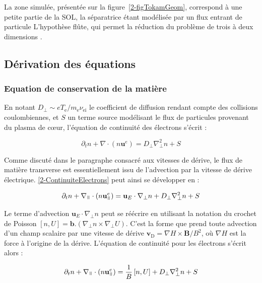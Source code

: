 \begin{refsection}
La zone simulée, présentée sur la figure~\ref{2-figTokamGeom}, correspond à une
petite partie de la SOL, la séparatrice étant modélisée par un flux entrant de
particule L'hypothèse flûte, qui permet la réduction du problème de trois à deux
dimensions .

\subsection{Dérivation des équations}
\subsubsection{Equation de conservation de la matière}
En notant $D_\perp\sim eT_\text{e}/m_\text{e}\nu_\text{ei}$ le coefficient de
diffusion rendant compte des collisions coulombiennes, et $S$ un terme source modélisant le flux de particules
provenant du plasma de c\oe{}ur, l'équation de continuité des électrons s'écrit :

\begin{equation}
\label{2-ContinuiteElectrons}
\partial_t n + \nabla\cdot(n\mathbf{u}^e) = D_\perp\nabla^2_\perp n + S
\end{equation}

Comme discuté dans le paragraphe consacré aux vitesses de dérive, le flux de
matière transverse est essentiellement issu de l'advection par la vitesse de
dérive électrique. \eqref{2-ContinuiteElectrons} peut ainsi se
développer en :

\begin{equation}
\label{2-ContinuiteElectrons2}
\partial_t n + \nabla_\para\cdot(n\mathbf{u}^e_{\para}) =
\mathbf{u}_E\cdot\nabla_\perp n + D_\perp\nabla^2_\perp n + S
\end{equation}

Le terme d'advection $\mathbf{u}_E\cdot\nabla_\perp
n$ peut se réécrire en utilisant la notation
du crochet de Poisson $[n,U]=\mathbf{b}.(\nabla_\perp n\times\nabla_\perp U)$.
C'est la forme que prend toute advection d'un champ scalaire par une vitesse de
dérive $\mathbf{v}_\text{D}=\nabla H\times\mathbf{B}/B^2$, où $\nabla H$ est la
force à l'origine de la dérive. L'équation de continuité pour les électrons
s'écrit alors :

\begin{equation}
\label{2-eqContinuiteFinale}
\partial_t n + \nabla_{\para}\cdot(n\mathbf{u}^e_{\para}) =
\frac{1}{B}\left[n,U\right] + D_\perp\nabla^2_\perp n + S
\end{equation}


\end{refsection}
